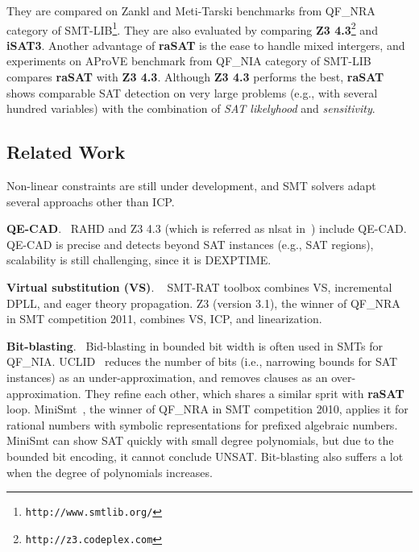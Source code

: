 \documentclass[runningheads,a4paper,oribibl]{llncs}
\begin{document}
They are compared on Zankl and Meti-Tarski benchmarks from 
QF\_NRA category of SMT-LIB\footnote{\tt http://www.smtlib.org/}. 
They are also evaluated by comparing 
{\bf Z3 4.3}\footnote{\tt http://z3.codeplex.com} and {\bf iSAT3}. 
Another advantage of {\bf raSAT} is the ease to handle mixed intergers, 
and experiments on AProVE benchmark from QF\_NIA category of SMT-LIB compares {\bf raSAT} with 
{\bf Z3 4.3}. 
Although {\bf Z3 4.3} performs the best, {\bf raSAT} shows comparable SAT detection on 
very large problems (e.g., with several hundred variables) with the combination of 
{\em SAT likelyhood} and {\em sensitivity}. 


\subsection*{Related Work} \label{sec:relate}

Non-linear constraints are still under development, and SMT solvers adapt 
several approachs other than ICP. 

\medskip \noindent
\textbf{QE-CAD}. ~RAHD \cite{rahd} and 
Z3 4.3 (which is referred as nlsat in~\cite{Jovanovic13}) include QE-CAD. 
QE-CAD is precise and detects beyond SAT instances (e.g., SAT regions), 
scalability is still challenging, since it is DEXPTIME. 

\medskip \noindent
\textbf{Virtual substitution (VS)}. ~
SMT-RAT toolbox \cite{smtrat}\cite{vssmt} combines 
VS, incremental DPLL, and %
eager theory propagation. 
Z3 (version 3.1), the winner of QF\_NRA in SMT competition 2011, 
combines VS, ICP, and linearization.

\medskip \noindent
\textbf{Bit-blasting}. ~Bid-blasting in bounded bit width is often used in SMTs for QF\_NIA. 
UCLID~\cite{uclid} reduces the number of bits (i.e., narrowing bounds for SAT instances) 
as an under-approximation, and removes clauses as an over-approximation. 
They refine each other, which shares a similar sprit with {\bf raSAT} loop. 
MiniSmt~\cite{minismt}, the winner of QF\_NRA in SMT competition 2010, 
applies it for rational numbers with symbolic representations for prefixed algebraic numbers. 
MiniSmt can show SAT quickly with small degree polynomials, but due to the bounded bit encoding, 
it cannot conclude UNSAT.
Bit-blasting also suffers a lot when the degree of polynomials increases. 
\end{document}
